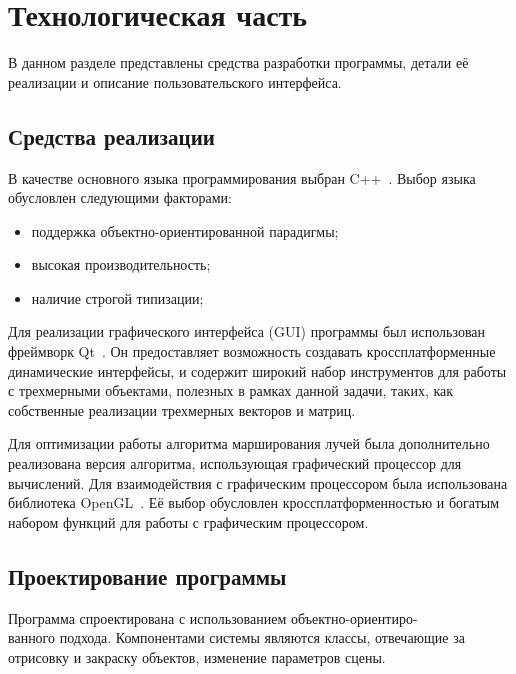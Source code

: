 \section{Технологическая часть}

В данном разделе представлены средства разработки программы, детали её реализации
и описание пользовательского интерфейса.

\subsection{Средства реализации}

В качестве основного языка программирования выбран C++~\cite{cpp}.
Выбор языка обусловлен следующими факторами:

\begin{itemize}
  \item поддержка объектно-ориентированной парадигмы;
  \item высокая производительность;
  \item наличие строгой типизации;
\end{itemize}

Для реализации графического интерфейса (GUI) программы был использован фреймворк Qt~\cite{qt}.
Он предоставляет возможность создавать кроссплатформенные динамические интерфейсы, и содержит
широкий набор инструментов для работы с трехмерными объектами,
полезных в рамках данной задачи, таких, как собственные реализации
трехмерных векторов и матриц.

Для оптимизации работы алгоритма марширования лучей была дополнительно реализована
версия алгоритма, использующая графический процессор для вычислений. Для взаимодействия
с графическим процессором была использована библиотека OpenGL~\cite{opengl}. Её выбор обусловлен
кроссплатформенностью и богатым набором функций для работы с графическим процессором.

\subsection{Проектирование программы}

Программа спроектирована с использованием объектно-ориентиро-\\ванного подхода. Компонентами
системы являются классы, отвечающие за отрисовку и закраску объектов, изменение параметров сцены.

